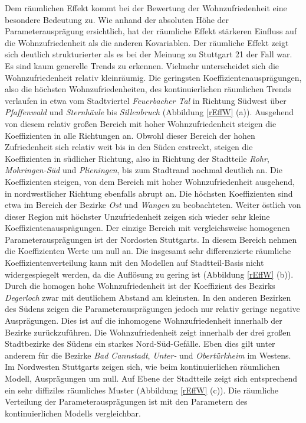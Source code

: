 \documentclass{Vorlage}
\begin{document}
Dem räumlichen Effekt kommt bei der Bewertung der Wohnzufriedenheit eine besondere Bedeutung zu. Wie anhand der absoluten Höhe der Parameterausprägung ersichtlich, hat der räumliche Effekt stärkeren Einfluss auf die Wohnzufriedenheit als die anderen Kovariablen. Der räumliche Effekt zeigt sich deutlich strukturierter als es bei der Meinung zu Stuttgart 21 der Fall war. Es sind kaum generelle Trends zu erkennen. Vielmehr unterscheidet sich die Wohnzufriedenheit relativ kleinräumig. Die geringsten Koeffizientenausprägungen, also die höchsten Wohnzufriedenheiten, des kontinuierlichen räumlichen Trends verlaufen in etwa vom Stadtviertel \textit{Feuerbacher Tal} in Richtung Südwest über \textit{Pfaffenwald} und \textit{Sternhäule} bis \textit{Sillenbruch} (Abbildung \ref{rEffW} (a)). Ausgehend von diesem relativ großen Bereich mit hoher Wohnzufriedenheit steigen die Koeffizienten in alle Richtungen an. Obwohl dieser Bereich der hohen Zufriedenheit sich relativ weit bis in den Süden erstreckt, steigen die Koeffizienten in südlicher Richtung, also in Richtung der Stadtteile \textit{Rohr}, \textit{Mohringen-Süd} und \textit{Plieningen}, bis zum Stadtrand nochmal deutlich an. Die Koeffizienten steigen, von dem Bereich mit hoher Wohnzufriedenheit ausgehend, in nordwestlicher Richtung ebenfalls abrupt an. Die höchsten  Koeffizienten sind etwa im Bereich der Bezirke \textit{Ost} und \textit{Wangen} zu beobachteten. Weiter östlich von dieser Region mit höchster Unzufriedenheit zeigen sich wieder sehr kleine Koeffizientenausprägungen. Der einzige Bereich mit vergleichsweise homogenen Parameterausprägungen ist der Nordosten Stuttgarts. In diesem Bereich nehmen die Koeffizienten Werte um null an. Die insgesamt sehr differenzierte räumliche Koeffizientenverteilung kann mit den Modellen auf Stadtteil-Basis nicht widergespiegelt werden, da die Auflösung zu gering ist (Abbildung \ref{rEffW} (b)). Durch die homogen hohe Wohnzufriedenheit ist der Koeffizient des Bezirks \textit{Degerloch} zwar mit deutlichem Abstand am kleinsten. In den anderen Bezirken des Südens zeigen die Parameterausprägungen jedoch nur relativ geringe negative Ausprägungen. Dies ist auf die inhomogene Wohnzufriedenheit innerhalb der Bezirke zurückzuführen. Die Wohnzufriedenheit zeigt innerhalb der drei großen Stadtbezirke des Südens ein starkes Nord-Süd-Gefälle. Eben dies gilt unter anderem für die Bezirke \textit{Bad Cannstadt}, \textit{Unter-} und \textit{Obertürkheim} im Westens. Im Nordwesten Stuttgarts zeigen sich, wie beim kontinuierlichen räumlichen Modell, Ausprägungen um null. Auf Ebene der Stadtteile zeigt sich entsprechend ein sehr diffiziles räumliches Muster (Abbildung \ref{rEffW} (c)). Die räumliche Verteilung der Parameterausprägungen ist mit den Parametern des kontinuierlichen Modells vergleichbar.
\end{document}
